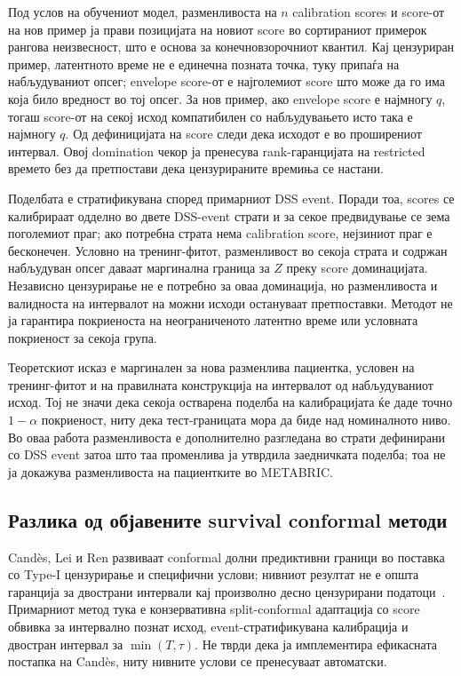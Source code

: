 \documentclass[12pt]{article}
\begin{document}
Под услов на обучениот модел, разменливоста на $n$ calibration scores и score-от
на нов пример ја прави позицијата на новиот score во сортираниот примерок
рангова неизвесност, што е основа за конечновзорочниот квантил. Кај цензуриран
пример, латентното време не е единечна позната точка, туку припаѓа на
набљудуваниот опсег; envelope score-от е најголемиот score што може да го има
која било вредност во тој опсег. За нов пример, ако envelope score е најмногу
$q$, тогаш score-от на секој исход компатибилен со набљудувањето исто така е
најмногу $q$. Од дефиницијата на score следи дека исходот е во проширениот
интервал. Овој domination чекор ја пренесува rank-гаранцијата на restricted
времето без да претпостави дека цензурираните времиња се настани.

Поделбата е стратификувана според примарниот DSS event. Поради тоа, scores се
калибрираат одделно во двете DSS-event страти и за секое предвидување се зема
поголемиот праг; ако потребна страта нема calibration score, нејзиниот праг е
бесконечен. Условно на тренинг-фитот, разменливост во секоја страта и содржан
набљудуван опсег даваат маргинална граница за $Z$ преку score доминацијата.
Независно цензурирање не е потребно за оваа доминација, но разменливоста и
валидноста на интервалот на можни исходи остануваат претпоставки. Методот не ја
гарантира покриеноста на неограниченото латентно време или условната покриеност
за секоја група.

Теоретскиот исказ е маргинален за нова разменлива пациентка, условен на
тренинг-фитот и на правилната конструкција на интервалот од набљудуваниот
исход. Тој не значи дека секоја остварена поделба на калибрацијата ќе даде
точно $1-\alpha$ покриеност, ниту дека тест-границата мора да биде над
номиналното ниво. Во оваа работа разменливоста е дополнително разгледана во
страти дефинирани со DSS event затоа што таа променлива ја утврдила заедничката
поделба; тоа не ја докажува разменливоста на пациентките во METABRIC.

\subsection{Разлика од објавените survival conformal методи}

Candès, Lei и Ren развиваат conformal долни предиктивни граници во поставка со
Type-I цензурирање и специфични услови; нивниот резултат не е општа гаранција за
двострани интервали кај произволно десно цензурирани податоци~\cite{candes2023}.
Примарниот метод тука е конзервативна split-conformal адаптација со score
обвивка за интервално познат исход, event-стратификувана калибрација и двостран
интервал за $\min(T,\tau)$. Не тврди дека ја имплементира ефикасната постапка
на Candès, ниту нивните услови се пренесуваат автоматски.
\end{document}
